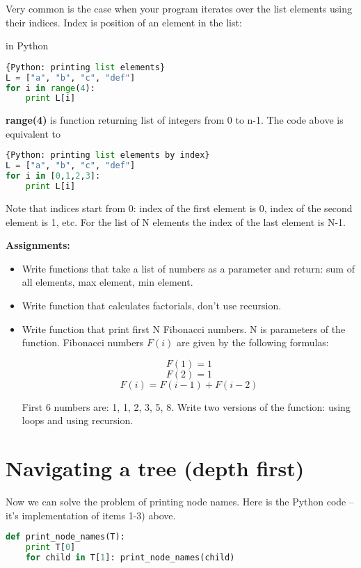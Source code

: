 Very common is the case when your program iterates over the
list elements using their indices. Index is position of an element
in the list:

in Python
\begin{lstlisting}[style=codelst,language=Python]{Python: printing list elements}
L = ["a", "b", "c", "def"]
for i in range(4):
    print L[i]
\end{lstlisting}

\textbf{range(4)} is function returning list of integers from 0 to n-1.
The code above is equivalent to
\begin{lstlisting}[style=codelst,language=Python]{Python: printing list elements by index}
L = ["a", "b", "c", "def"]
for i in [0,1,2,3]:
    print L[i]
\end{lstlisting}
Note that indices start from 0: index of the first element is 0, index of
the second element is 1, etc. For the list of N elements the index of the last element
is N-1.

\bigskip
\begin{tcolorbox}
\textbf{Assignments:}
\begin{itemize}
\item Write functions that take a list of numbers as a parameter
and return: sum of all elements, max element, min element.
\item Write function that calculates factorials, don't use recursion.
\item Write function that print first N Fibonacci numbers. N is parameters
of the function. Fibonacci numbers $F(i)$ are given by the following
formulas:

$$F(1) = 1$$ $$F(2) = 1$$ $$F(i) = F(i-1) + F(i-2) $$

First 6 numbers are: 1, 1, 2, 3, 5, 8.
Write two versions of the function: using loops and using recursion.
\end{itemize}
\end{tcolorbox}


\section{Navigating a tree (depth first)}
Now we can solve the problem of printing node names.
Here is the Python code --
it's implementation of items 1-3) above.

\begin{lstlisting}[style=codelst,language=Python]
def print_node_names(T):
    print T[0]
    for child in T[1]: print_node_names(child)
\end{lstlisting}

